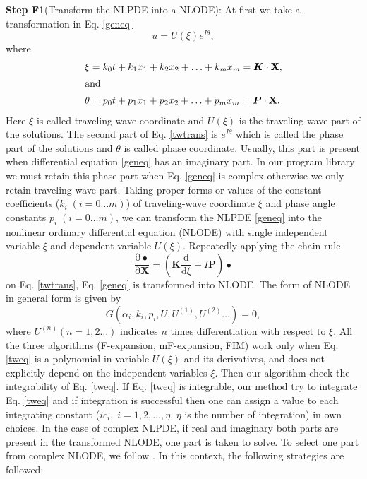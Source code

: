 \documentclass[prd,aps,floats,showkeys,nofootinbib,notitlepage]{revtex4-2}
\begin{document}
	\textbf{Step F1}(Transform the NLPDE into a NLODE): At first we take a transformation in Eq. \eqref{geneq}
	\begin{equation}\label{twtrans}
		u = U(\xi )e^{I\theta},
	\end{equation}
	where
	\begin{align}
		\label{twco}& \xi = k_0t + k_1{x_1} + {k_2}{x_2} +  \ldots  + {k_m}{x_m}=\boldsymbol{K}\cdot\mathbf{X},\nonumber\\
		\intertext{and}& \theta = {p_0}t + {p_1}{x_1} + {p_2}{x_2} +  \ldots  + {p_m}{x_m}=\boldsymbol{P}\cdot\mathbf{X}.
	\end{align}
	Here $\xi$ is called traveling-wave coordinate and $U(\xi )$ is the traveling-wave part  of the solutions. The second part of Eq. \eqref{twtrans} is $e^{I\theta}$ which is called the phase part of the solutions and $\theta$ is called phase coordinate. Usually, this part is present when differential equation \eqref{geneq} has an imaginary part. In our program library we must retain this phase part when Eq. \eqref{geneq} is complex otherwise we only retain traveling-wave part. Taking proper forms or values of the constant coefficients ($k_i\;(i=0\ldots m)$) of traveling-wave coordinate $\xi$ and phase angle constants $p_i\;(i=0\ldots m)$, we can transform the NLPDE \eqref{geneq}  into the nonlinear ordinary differential equation (NLODE) with single independent variable $\xi$ and dependent variable $U(\xi)$. Repeatedly applying the chain rule 
	\begin{equation}\label{twtrans2}
		\frac{\mathrm{\partial} \bullet }{\mathrm{\partial} \mathbf{X}}=\left ( \boldsymbol{K}\frac{\mathrm{d} }{\mathrm{d} \xi}+I\boldsymbol{P} \right )\bullet
	\end{equation}
	on Eq. \eqref{twtrans}, Eq. \eqref{geneq} is transformed into NLODE. The form of NLODE in general form is given by
	\begin{equation}\label{tweq}
		G\left( {\alpha_i,k_i,p_i,U,U^{(1)},U^{(2)}} \ldots \right) = 0,
	\end{equation}
	where $U^{(n)} (n=1,2\ldots)$ indicates $n$ times differentiation with respect to $\xi$. All the three algorithms (F-expansion, mF-expansion, FIM) work only when Eq. \eqref{tweq} is a polynomial in variable $U(\xi)$ and its derivatives, and does not explicitly depend on the independent variables $\xi$. Then our algorithm check the integrability of Eq. \eqref{tweq}. If Eq. \eqref{tweq} is integrable, our method try to integrate Eq. \eqref{tweq} and if integration is successful then one can assign a value to each integrating constant ($ic_i,\;i=1,2,\ldots,\eta$, $\eta$ is the number of integration) in own choices. In the case of complex NLPDE, if real and imaginary both parts are present in the transformed NLODE, one part is taken to solve. To select one part from complex NLODE, we follow \cite{complexTwt,complexTwt1}. In this context, the following strategies are followed:
\end{document}
